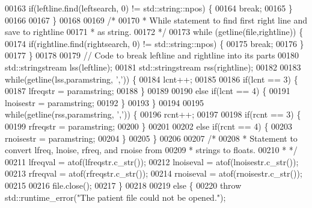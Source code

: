 \begin{DoxyCode}
00163                 \textcolor{keywordflow}{if}(leftline.find(leftsearch, 0) != std::string::npos) \{
00164                     \textcolor{keywordflow}{break};
00165                 \}
00166 
00167             \}
00168 
00169             \textcolor{comment}{/*}
00170 \textcolor{comment}{             * While statement to find first right line and save to rightline}
00171 \textcolor{comment}{             * as string.}
00172 \textcolor{comment}{             */}
00173             \textcolor{keywordflow}{while} (getline(file,rightline)) \{
00174                 \textcolor{keywordflow}{if}(rightline.find(rightsearch, 0) != std::string::npos) \{
00175                     \textcolor{keywordflow}{break};
00176                 \}
00177             \}
00178 
00179             \textcolor{comment}{// Code to break leftline and rightline into its parts}
00180             std::stringstream lss(leftline);
00181             std::stringstream rss(rightline);
00182 
00183             \textcolor{keywordflow}{while}(getline(lss,paramstring, \textcolor{charliteral}{','})) \{
00184                 lcnt++;
00185 
00186                 \textcolor{keywordflow}{if}(lcnt == 3) \{
00187                     lfreqstr = paramstring;
00188                 \}
00189 
00190                 \textcolor{keywordflow}{else} \textcolor{keywordflow}{if}(lcnt == 4) \{
00191                     lnoisestr = paramstring;
00192                 \}
00193             \}
00194 
00195             \textcolor{keywordflow}{while}(getline(rss,paramstring, \textcolor{charliteral}{','})) \{
00196                 rcnt++;
00197 
00198                 \textcolor{keywordflow}{if}(rcnt == 3) \{
00199                     rfreqstr = paramstring;
00200                 \}
00201 
00202                 \textcolor{keywordflow}{else} \textcolor{keywordflow}{if}(rcnt == 4) \{
00203                     rnoisestr = paramstring;
00204                 \}
00205             \}
00206 
00207             \textcolor{comment}{/*}
00208 \textcolor{comment}{             * Statement to convert lfreq, lnoise, rfreq, and rnoise from}
00209 \textcolor{comment}{             * strings to floats.}
00210 \textcolor{comment}{             * */}
00211             lfreqval = atof(lfreqstr.c\_str());
00212             lnoiseval = atof(lnoisestr.c\_str());
00213             rfreqval = atof(rfreqstr.c\_str());
00214             rnoiseval = atof(rnoisestr.c\_str());
00215 
00216             file.close();
00217         \}
00218 
00219         \textcolor{keywordflow}{else} \{
00220             \textcolor{keywordflow}{throw} std::runtime\_error(\textcolor{stringliteral}{"The patient file could not be opened."});

\end{DoxyCode}
